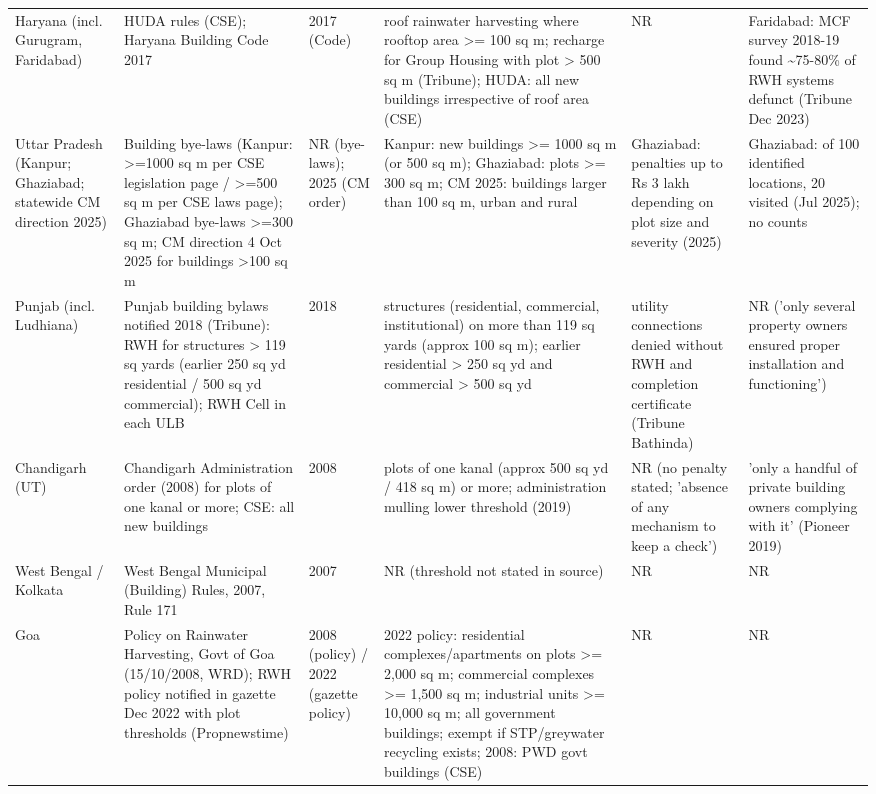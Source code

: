 {\begin{longtable}{p{2.1cm} p{3cm} p{1.3cm} p{3cm} p{2.9cm} p{3.4cm}}
Haryana (incl. Gurugram, Faridabad) & HUDA rules (CSE); Haryana Building Code 2017 & 2017 (Code) & roof rainwater harvesting where rooftop area >= 100 sq m; recharge for Group Housing with plot > 500 sq m (Tribune); HUDA: all new buildings irrespective of roof area (CSE) & NR & Faridabad: MCF survey 2018-19 found \textasciitilde 75-80\% of RWH systems defunct (Tribune Dec 2023)\\
Uttar Pradesh (Kanpur; Ghaziabad; statewide CM direction 2025) & Building bye-laws (Kanpur: >=1000 sq m per CSE legislation page / >=500 sq m per CSE laws page); Ghaziabad bye-laws >=300 sq m; CM direction 4 Oct 2025 for buildings >100 sq m & NR (bye-laws); 2025 (CM order) & Kanpur: new buildings >= 1000 sq m (or 500 sq m); Ghaziabad: plots >= 300 sq m; CM 2025: buildings larger than 100 sq m, urban and rural & Ghaziabad: penalties up to Rs 3 lakh depending on plot size and severity (2025) & Ghaziabad: of 100 identified locations, 20 visited (Jul 2025); no counts\\
Punjab (incl. Ludhiana) & Punjab building bylaws notified 2018 (Tribune): RWH for structures > 119 sq yards (earlier 250 sq yd residential / 500 sq yd commercial); RWH Cell in each ULB & 2018 & structures (residential, commercial, institutional) on more than 119 sq yards (approx 100 sq m); earlier residential > 250 sq yd and commercial > 500 sq yd & utility connections denied without RWH and completion certificate (Tribune Bathinda) & NR ('only several property owners ensured proper installation and functioning')\\
Chandigarh (UT) & Chandigarh Administration order (2008) for plots of one kanal or more; CSE: all new buildings & 2008 & plots of one kanal (approx 500 sq yd / 418 sq m) or more; administration mulling lower threshold (2019) & NR (no penalty stated; 'absence of any mechanism to keep a check') & 'only a handful of private building owners complying with it' (Pioneer 2019)\\
West Bengal / Kolkata & West Bengal Municipal (Building) Rules, 2007, Rule 171 & 2007 & NR (threshold not stated in source) & NR & NR\\
Goa & Policy on Rainwater Harvesting, Govt of Goa (15/10/2008, WRD); RWH policy notified in gazette Dec 2022 with plot thresholds (Propnewstime) & 2008 (policy) / 2022 (gazette policy) & 2022 policy: residential complexes/apartments on plots >= 2,000 sq m; commercial complexes >= 1,500 sq m; industrial units >= 10,000 sq m; all government buildings; exempt if STP/greywater recycling exists; 2008: PWD govt buildings (CSE) & NR & NR\\

\end{longtable}}
